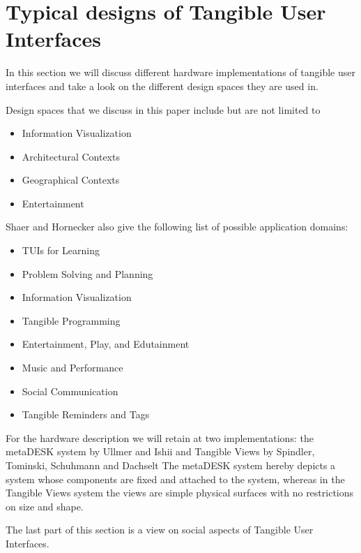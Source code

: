 \section{Typical designs of Tangible User Interfaces}

In this section we will discuss different hardware implementations of tangible user interfaces and take a look on the different design spaces they are used in. 

Design spaces that we discuss in this paper include but are not limited to
\begin{itemize}
\item  Information Visualization
\item Architectural Contexts
\item Geographical Contexts
\item Entertainment
\end{itemize}

Shaer and Hornecker \cite{hornecker10} also give the following list of possible application domains:
\begin{itemize}
\item TUIs for Learning
\item Problem Solving and Planning
\item Information Visualization
\item Tangible Programming
\item Entertainment, Play, and Edutainment
\item Music and Performance
\item Social Communication 
\item Tangible Reminders and Tags
\end{itemize}

For the hardware description we will retain at two implementations: the metaDESK system by Ullmer and Ishii \cite{ullmer97} and Tangible Views by Spindler, Tominski, Schuhmann and Dachselt \cite{spindler10}
The metaDESK system hereby depicts a system whose components are fixed and attached to the system, whereas in the Tangible Views system the views are simple physical surfaces with no restrictions on size and shape. 

The last part of this section is a view on social aspects of Tangible User Interfaces.


